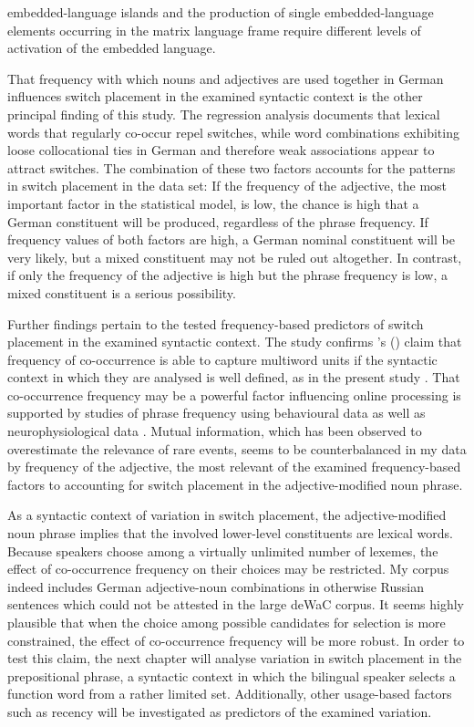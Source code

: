 embedded-language islands and the production of single embedded-language elements occurring in the matrix language frame require different levels of activation of the embedded language.

That frequency with which nouns and adjectives are used together in German influences switch placement in the examined syntactic context is the other principal finding of this study. The regression analysis documents that lexical words that regularly co-occur repel switches, while word combinations exhibiting loose collocational ties in German and therefore weak associations appear to attract switches. The combination of these two factors accounts for the patterns in switch placement in the data set: If the frequency of the adjective, the most important factor in the statistical model, is low, the chance is high that a German constituent will be produced, regardless of the phrase frequency. If frequency values of both factors are high, a German nominal constituent will be very likely, but a mixed constituent may not be ruled out altogether. In contrast, if only the frequency of the adjective is high but the phrase frequency is low, a mixed constituent is a serious possibility.

Further findings pertain to the tested frequency-based predictors of switch placement in the examined syntactic context. The study confirms \citeauthor{heylen-2014}'s (\citeyear{heylen-2014}) claim that frequency of co-occurrence is able to capture multiword units if the syntactic context in which they are analysed is well defined, as in the present study \citep[see also][]{schneider2014}. That co-occurrence frequency may be a powerful factor influencing online processing is supported by studies of phrase frequency using behavioural data \citep{arnon-snider,janssen-barber} as well as neurophysiological data \citep{tremblay-baayen}. Mutual information, which has been  observed to overestimate the relevance of rare events, seems to be counterbalanced in my data by frequency of the adjective, the most relevant of the examined frequency-based factors to accounting for switch placement in the adjective-modified noun phrase.

As a syntactic context of variation in switch placement, the adjective-modified noun phrase implies that the involved lower-level constituents are lexical words. Because speakers choose among a virtually unlimited number of lexemes, the effect of co-occurrence frequency on their choices may be restricted. My corpus indeed includes German adjective-noun combinations in otherwise Russian sentences which could not be attested in the large deWaC corpus. It seems highly plausible that when the choice among possible candidates for selection is more constrained, the effect of co-occurrence frequency will be more robust. In order to test this claim, the next chapter will analyse variation in switch placement in the prepositional phrase, a syntactic context in which the bilingual speaker selects a function word from a rather limited set. Additionally, other usage-based factors such as recency will be investigated as predictors of the examined variation.
